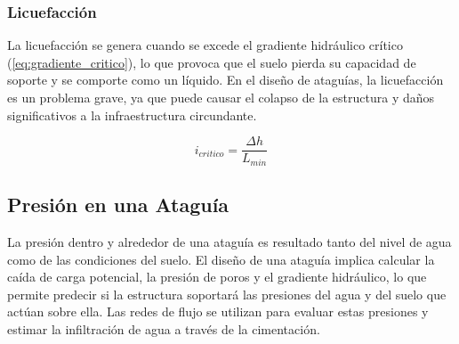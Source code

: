 \subsubsection{Licuefacción}
La licuefacción se genera cuando se excede el gradiente hidráulico crítico (\ref{eq:gradiente_critico}), lo que provoca que el suelo pierda su capacidad de soporte y se comporte como un líquido. En el diseño de ataguías, la licuefacción es un problema grave, ya que puede causar el colapso de la estructura y daños significativos a la infraestructura circundante. \cite{budhu_soil_2010}

\begin{equation}
    i_{critico} = \frac{\Delta h}{L_{min}}
    \label{eq:gradiente_critico}
\end{equation}

\subsection{Presión en una Ataguía}
La presión dentro y alrededor de una ataguía es resultado tanto del nivel de agua como de las condiciones del suelo. El diseño de una ataguía implica calcular la caída de carga potencial, la presión de poros y el gradiente hidráulico, lo que permite predecir si la estructura soportará las presiones del agua y del suelo que actúan sobre ella. Las redes de flujo se utilizan para evaluar estas presiones y estimar la infiltración de agua a través de la cimentación. \cite{sivakugan2005}




